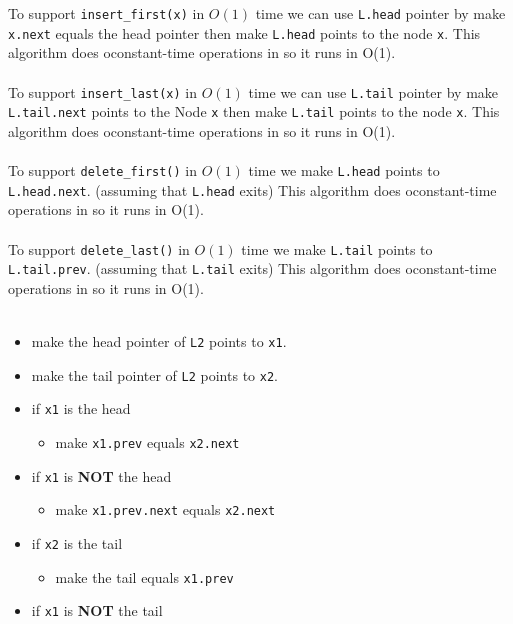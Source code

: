 \documentclass[12pt,twoside]{article}
\begin{document}
\begin{problems}
\begin{problemparts}
\problempart %
  To support {\tt insert\_first(x)} in $O(1)$ time we can use {\tt L.head} pointer by make {\tt x.next} equals the 
  head pointer then make {\tt L.head} points to the node {\tt x}. 
  This algorithm does oconstant-time operations in so it runs in O(1). \\ 
  \\
  To support {\tt insert\_last(x)} in $O(1)$ time we can use {\tt L.tail} pointer by make {\tt L.tail.next} points 
  to the Node {\tt x} then make {\tt L.tail} points to the node {\tt x}.
  This algorithm does oconstant-time operations in so it runs in O(1). \\
  \\
  To support {\tt delete\_first()} in $O(1)$ time we make {\tt L.head} points to {\tt L.head.next}. 
  (assuming that {\tt L.head} exits) 
  This algorithm does oconstant-time operations in so it runs in O(1). \\
  \\
  To support {\tt delete\_last()} in $O(1)$ time we make {\tt L.tail} points to {\tt L.tail.prev}.
  (assuming that {\tt L.tail} exits)
  This algorithm does oconstant-time operations in so it runs in O(1). \\
  \\
\problempart %
  \begin{itemize}
    \item make the head pointer of {\tt L2} points to {\tt x1}.
    \item make the tail pointer of {\tt L2} points to {\tt x2}.
    \item if {\tt x1} is the head
      \begin{itemize}
        \item make {\tt x1.prev} equals {\tt x2.next}
      \end{itemize}
    \item if {\tt x1} is \textbf{NOT} the head
      \begin{itemize}
        \item make {\tt x1.prev.next} equals {\tt x2.next}
      \end{itemize}
    \item if {\tt x2} is the tail
      \begin{itemize}
          \item make the tail equals {\tt x1.prev}
      \end{itemize}
    \item if {\tt x1} is \textbf{NOT} the tail

\end{itemize}
\end{problemparts}
\end{problems}
\end{document}

